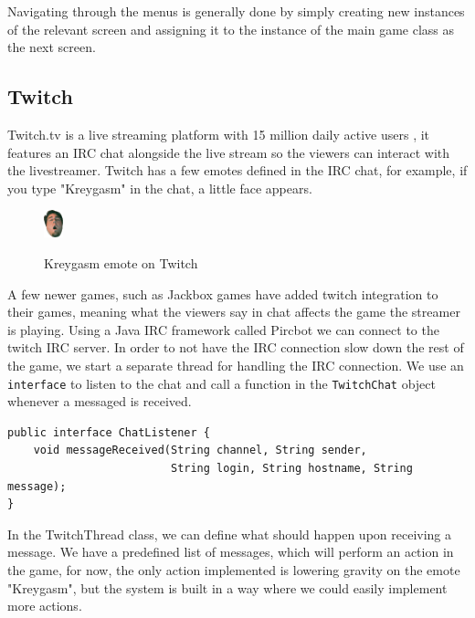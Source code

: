 \documentclass[12p]{article}
\begin{document}
Navigating through the menus is generally done by simply creating new instances of the relevant screen and assigning it to the instance of the main game class as the next screen.


\newpage
\subsection{Twitch} \label{Twitch}

Twitch.tv is a live streaming platform with 15 million daily active users \cite{twitchAbout}, it features an IRC chat alongside the live stream so the viewers can interact with the livestreamer. Twitch has a few emotes defined in the IRC chat, for example, if you type "Kreygasm" in the chat, a little face appears.

\begin{figure}[ht]
  \center
  \includegraphics[width=0.05\textwidth]{Documentation/Kreygasm.png}
  \label{Kreygasm_emote}
  \caption{Kreygasm emote on Twitch \cite{TwitchEmotes}}
\end{figure}

A few newer games, such as Jackbox games \cite{JackboxGames} have added twitch integration to their games, meaning what the viewers say in chat affects the game the streamer is playing. Using a Java IRC framework called Pircbot \cite{pircbot} we can connect to the twitch IRC server. In order to not have the IRC connection slow down the rest of the game, we start a separate thread for handling the IRC connection. We use an \texttt{interface} to listen to the chat and call a function in the \texttt{TwitchChat} object whenever a messaged is received.

\begin{verbatim}
public interface ChatListener {
    void messageReceived(String channel, String sender,
                         String login, String hostname, String message);
}
\end{verbatim}

In the TwitchThread class, we can define what should happen upon receiving a message. We have a predefined list of messages, which will perform an action in the game, for now, the only action implemented is lowering gravity on the emote "Kreygasm", but the system is built in a way where we could easily implement more actions.
\end{document}
